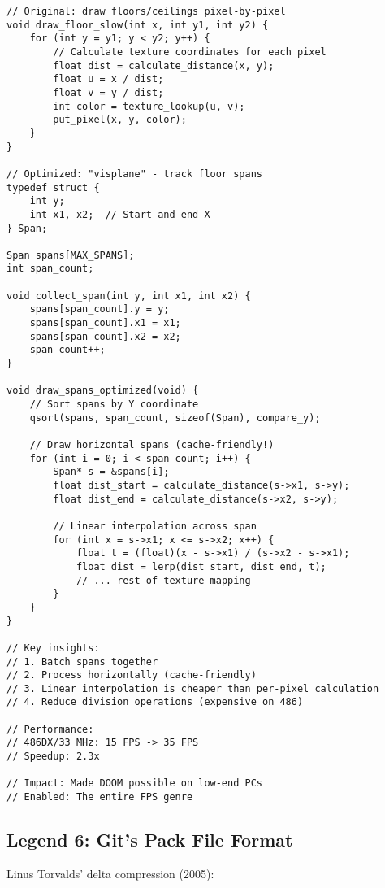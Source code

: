 \begin{lstlisting}
// Original: draw floors/ceilings pixel-by-pixel
void draw_floor_slow(int x, int y1, int y2) {
    for (int y = y1; y < y2; y++) {
        // Calculate texture coordinates for each pixel
        float dist = calculate_distance(x, y);
        float u = x / dist;
        float v = y / dist;
        int color = texture_lookup(u, v);
        put_pixel(x, y, color);
    }
}

// Optimized: "visplane" - track floor spans
typedef struct {
    int y;
    int x1, x2;  // Start and end X
} Span;

Span spans[MAX_SPANS];
int span_count;

void collect_span(int y, int x1, int x2) {
    spans[span_count].y = y;
    spans[span_count].x1 = x1;
    spans[span_count].x2 = x2;
    span_count++;
}

void draw_spans_optimized(void) {
    // Sort spans by Y coordinate
    qsort(spans, span_count, sizeof(Span), compare_y);

    // Draw horizontal spans (cache-friendly!)
    for (int i = 0; i < span_count; i++) {
        Span* s = &spans[i];
        float dist_start = calculate_distance(s->x1, s->y);
        float dist_end = calculate_distance(s->x2, s->y);

        // Linear interpolation across span
        for (int x = s->x1; x <= s->x2; x++) {
            float t = (float)(x - s->x1) / (s->x2 - s->x1);
            float dist = lerp(dist_start, dist_end, t);
            // ... rest of texture mapping
        }
    }
}

// Key insights:
// 1. Batch spans together
// 2. Process horizontally (cache-friendly)
// 3. Linear interpolation is cheaper than per-pixel calculation
// 4. Reduce division operations (expensive on 486)

// Performance:
// 486DX/33 MHz: 15 FPS -> 35 FPS
// Speedup: 2.3x

// Impact: Made DOOM possible on low-end PCs
// Enabled: The entire FPS genre
\end{lstlisting}

\subsection{Legend 6: Git's Pack File Format}

Linus Torvalds' delta compression (2005):

